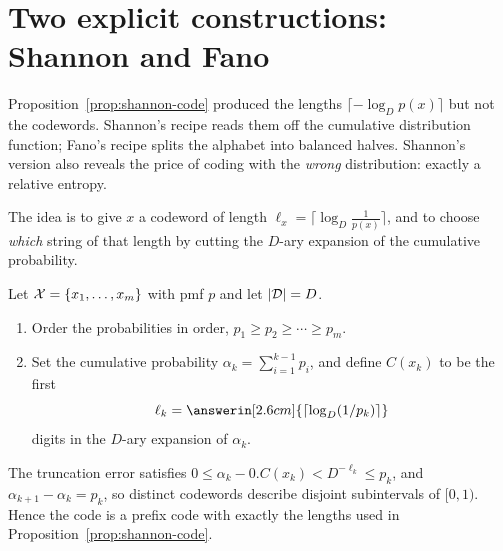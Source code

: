\section{Two explicit constructions: Shannon and Fano}\label{sec:shannon-fano}
\quad{}

\begin{strand}
Proposition~\ref{prop:shannon-code} produced the lengths
$\lceil-\log_Dp(x)\rceil$ but not the codewords. Shannon's recipe reads them off
the cumulative distribution function; Fano's recipe splits the alphabet into
balanced halves. Shannon's version also reveals the price of coding with the
\emph{wrong} distribution: exactly a relative entropy.
\end{strand}



The idea is to give $x$ a codeword of length
$\ell_x=\lceil\log_D\frac1{p(x)}\rceil$, and to choose \emph{which} string of
that length by cutting the $D$-ary expansion of the cumulative probability.

\begin{definition}\label{def:shannon-code-construction}
Let $\mathcal{X}=\{x_1,\ldots,x_m\}$ with pmf $p$ and let $|\mathcal{D}|=D$.
\begin{enumerate}
  \item Order the probabilities in  order,
  $p_1\ge p_2\ge\cdots\ge p_m$.
  \item Set the cumulative probability
  $\alpha_k=\sum_{i=1}^{k-1}p_i$, and define $C(x_k)$ to be the first
  \[
    \ell_k=\answerin[2.6cm]{\lceil\log_D(1/p_k)\rceil}
  \]
  digits in the $D$-ary expansion of $\alpha_k$.
\end{enumerate}
\end{definition}

The truncation error satisfies $0\le\alpha_k-0.C(x_k)<D^{-\ell_k}\le p_k$, and
$\alpha_{k+1}-\alpha_k=p_k$, so distinct codewords describe disjoint
subintervals of $[0,1)$. Hence the code is a prefix code with exactly the
lengths used in Proposition~\ref{prop:shannon-code}.


